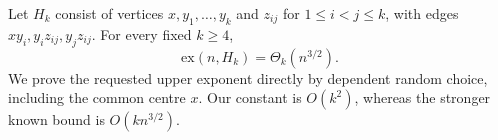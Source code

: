 Let \(H_k\) consist of vertices \(x,y_1,\ldots,y_k\) and \(z_{ij}\) for \(1\leq i<j\leq k\), with edges \(xy_i,y_iz_{ij},y_jz_{ij}\). For every fixed \(k\geq4\),
\[
\mathrm{ex}(n,H_k)=\Theta_k(n^{3/2}).
\]
We prove the requested upper exponent directly by dependent random choice, including the common centre \(x\). Our constant is \(O(k^2)\), whereas the stronger known bound is \(O(kn^{3/2})\).
